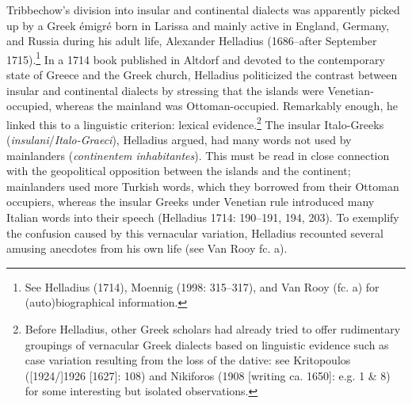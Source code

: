 \documentclass[12pt]{article}
\newenvironment{styleStandard}{\renewcommand\baselinestretch{1.25}\setlength\leftskip{0in}\setlength\rightskip{0in}\setlength\parindent{0.1972in}\setlength\parfillskip{0pt plus 1fil}\setlength\parskip{0in plus 1pt}\writerlistparindent\writerlistleftskip\leavevmode\normalfont\normalsize\writerlistlabel\ignorespaces}{\unskip\vspace{0in plus 1pt}\par}
\newcommand\writerlistleftskip{}
\newcommand\writerlistparindent{}
\newcommand\writerlistlabel{}
\begin{document}
\begin{styleStandard}
Tribbechow’s division into insular and continental dialects was apparently picked up by a Greek émigré born in Larissa and mainly active in England, Germany, and Russia during his adult life, Alexander Helladius (1686–after September 1715).\footnote{ See Helladius (1714), Moennig (1998: 315–317), and Van Rooy (fc. a) for (auto)biographical information.} In a 1714 book published in Altdorf and devoted to the contemporary state of Greece and the Greek church, Helladius politicized the contrast between insular and continental dialects by stressing that the islands were Venetian-occupied, whereas the mainland was Ottoman-occupied. Remarkably enough, he linked this to a linguistic criterion: lexical evidence.\footnote{ Before Helladius, other Greek scholars had already tried to offer rudimentary groupings of vernacular Greek dialects based on linguistic evidence such as case variation resulting from the loss of the dative: see Kritopoulos ([1924/]1926 [1627]: 108) and Nikiforos (1908 [writing ca. 1650]: e.g. 1 \& 8) for some interesting but isolated observations.} The insular Italo-Greeks (\textit{insulani}/\textit{Italo-Graeci}), Helladius argued, had many words not used by mainlanders (\textit{continentem inhabitantes}). This must be read in close connection with the geopolitical opposition between the islands and the continent; mainlanders used more Turkish words, which they borrowed from their Ottoman occupiers, whereas the insular Greeks under Venetian rule introduced many Italian words into their speech (Helladius 1714: 190–191, 194, 203). To exemplify the confusion caused by this vernacular variation, Helladius recounted several amusing anecdotes from his own life (see Van Rooy fc. a).
\end{styleStandard}
\end{document}
